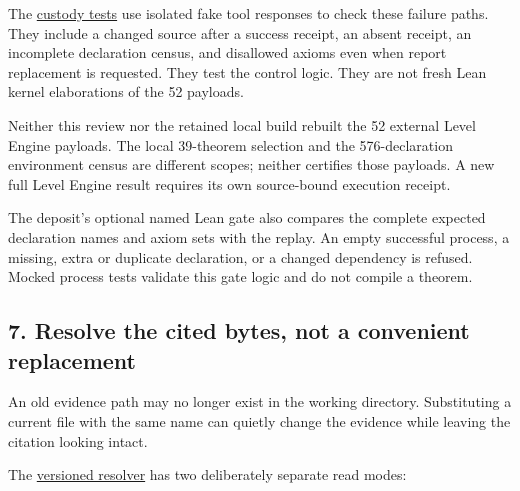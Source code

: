 \documentclass[
  11pt,
]{article}
\begin{document}
The
\href{https://github.com/dbccpage/the_symbol_game/blob/52cb5457f6c485ba548cfd292f6012a941ed22cf/operations/tests/level_engine/test_lean.py}{custody
tests} use isolated fake tool responses to check these failure paths.
They include a changed source after a success receipt, an absent
receipt, an incomplete declaration census, and disallowed axioms even
when report replacement is requested. They test the control logic. They
are not fresh Lean kernel elaborations of the 52 payloads.

Neither this review nor the retained local build rebuilt the 52 external
Level Engine payloads. The local 39-theorem selection and the
576-declaration environment census are different scopes; neither
certifies those payloads. A new full Level Engine result requires its
own source-bound execution receipt.

The deposit's optional named Lean gate also compares the complete
expected declaration names and axiom sets with the replay. An empty
successful process, a missing, extra or duplicate declaration, or a
changed dependency is refused. Mocked process tests validate this gate
logic and do not compile a theorem.

\hypertarget{resolve-the-cited-bytes-not-a-convenient-replacement}{%
\subsection{7. Resolve the cited bytes, not a convenient
replacement}\label{resolve-the-cited-bytes-not-a-convenient-replacement}}

An old evidence path may no longer exist in the working directory.
Substituting a current file with the same name can quietly change the
evidence while leaving the citation looking intact.

The
\href{https://github.com/dbccpage/the_symbol_game/blob/52cb5457f6c485ba548cfd292f6012a941ed22cf/symbol_game/infrastructure/tower_evidence/level_engine/resolver.py}{versioned
resolver} has two deliberately separate read modes:
\end{document}
